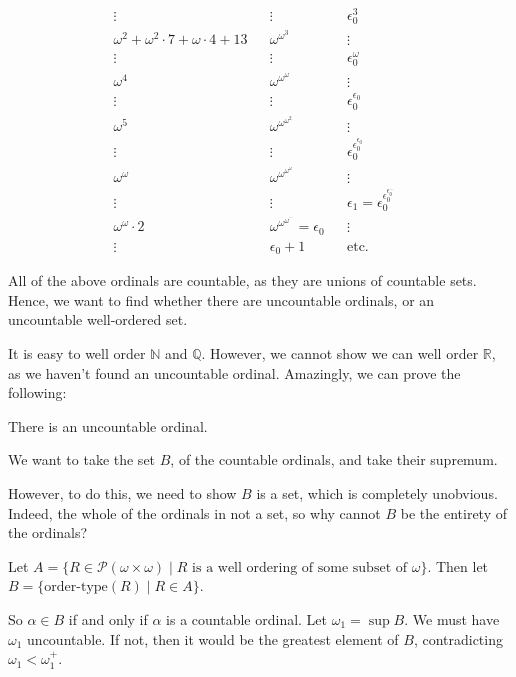 \documentclass[12pt]{article}
\begin{document}
\begin{exbox}
\begin{align*}
		\vdots& &\vdots& &                                                                        \epsilon_0^{3}& \\
		\omega^2 + \omega^2 \cdot 7 + \omega \cdot 4 + 13& &\omega^{\omega^3}& &                  \vdots& \\
		\vdots& &\vdots& &                                                                        \epsilon_0^{\omega}& \\
		\omega^{4}& &\omega^{\omega^{\omega}}& &                                                  \vdots& \\
		\vdots& &\vdots& &                                                                        \epsilon_0^{\epsilon_0}& \\
		\omega^{5}& &\omega^{\omega^{\omega^2}}& &                                                \vdots& \\
		\vdots& &\vdots& &                                                                        \epsilon_0^{\epsilon_0^{\epsilon_0}}& \\
		\omega^{\omega}& &\omega^{\omega^{\omega^{\omega}}}& &                                    \vdots& \\
		\vdots& &\vdots& &                                                                        \epsilon_1 = \epsilon_0^{\epsilon_0^{\epsilon_0^{\dots}}}&\\
		\omega^{\omega} \cdot 2& &\omega^{\omega^{\omega^{\cdots}}} = \epsilon_0& & \vdots&\\ 
		\vdots& &\epsilon_0 + 1& & \text{etc.}&
	\end{align*}
\end{exbox}

All of the above ordinals are countable, as they are unions of countable sets. Hence, we want to find whether there are uncountable ordinals, or an uncountable well-ordered set.

It is easy to well order $\mathbb{N}$ and $\mathbb{Q}$. However, we cannot show we can well order $\mathbb{R}$, as we haven't found an uncountable ordinal. Amazingly, we can prove the following:

\begin{theorem}
	There is an uncountable ordinal.
\end{theorem}

\begin{proofbox}
	We want to take the set $B$, of the countable ordinals, and take their supremum.

	However, to do this, we need to show $B$ is a set, which is completely unobvious. Indeed, the whole of the ordinals in not a set, so why cannot $B$ be the entirety of the ordinals?

	Let $A = \{R \in \mathcal{P}(\omega \times \omega) \mid R \text{ is a well ordering of some subset of } \omega\}$. Then let $B = \{\text{order-type}(R) \mid R \in A\}$.

	So $\alpha \in B$ if and only if $\alpha$ is a countable ordinal. Let $\omega_1 = \sup B$. We must have $\omega_1$ uncountable. If not, then it would be the greatest element of $B$, contradicting $\omega_1 < \omega_1^{+}$.
\end{proofbox}
\end{document}
